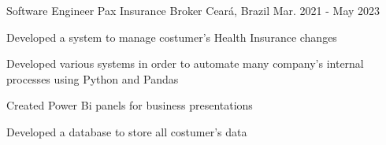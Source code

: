 \begin{cventries}
  \cventry
    {Software Engineer} %
    {Pax Insurance Broker} %
    {Ceará, Brazil} %
    {Mar. 2021 - May 2023} %
    {
      \begin{cvitems} %
        \item {Developed a system to manage costumer's Health Insurance changes}
        \item {Developed various systems in order to automate many company's internal processes using Python and Pandas}
        \item {Created Power Bi panels for business presentations}
        \item {Developed a database to store
        all costumer's data}
      \end{cvitems}
  }

\end{cventries}
